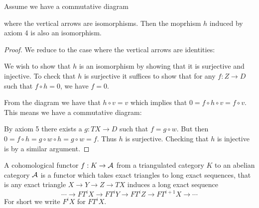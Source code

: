 \documentclass[a4paper, UKenglish]{report}
\begin{document}
\begin{proposition}[5-lemma]
Assume we have a commutative diagram


where the vertical arrows are isomorphisms. Then  the moprhism $h$ induced by axiom 4 is also an isomorphism.
\end{proposition}
\begin{proof}
We reduce to the case where the vertical arrows are identities:


We wish to show that $h$ is an isomorphism by showing that it is surjective and injective. To check that $h$ is surjective it suffices to show that for any $f: Z \to D$ such that $f \circ h = 0$, we have $f=0$.

From the diagram we have that $h \circ v=v$ which implies that $0=f \circ h \circ v=f \circ v$. This means we have a commutative diagram:


By axiom 5 there exists a $g: TX \to D$ such that $f= g \circ w$. But then $0=f \circ h = g \circ w \circ h = g \circ w = f$. Thus $h$ is surjective. Checking that $h$ is injective is by a similar argument.

\end{proof}

\begin{definition}
A cohomological functor $f:K \to \mathcal{A}$ from a triangulated category $K$ to an abelian category  $\mathcal{A}$  is a functor which takes exact triangles to long exact sequences, that is any exact triangle $X \to Y \to Z \to TX$ induces a long exact sequence
\[ \cdots \to FT^iX \to FT^iY \to FT^iZ \to FT^{i+1}X \to \cdots \]
For short we write $F^iX$ for $FT^iX$.
\end{definition}
\end{document}
